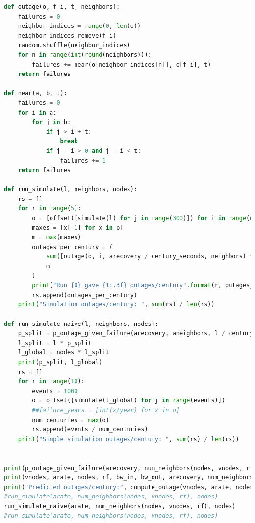 \documentclass{article}
\begin{document}
\begin{lstlisting}[language=Python]
def outage(o, f_i, t, neighbors):
    failures = 0
    neighbor_indices = range(0, len(o))
    neighbor_indices.remove(f_i)
    random.shuffle(neighbor_indices)
    for n in range(int(round(neighbors))):
        failures += near(o[neighbor_indices[n]], o[f_i], t)
    return failures

def near(a, b, t):
    failures = 0
    for i in a:
        for j in b:
            if j > i + t:
                break
            if j - i > 0 and j - i < t:
                failures += 1
    return failures

def run_simulate(l, neighbors, nodes):
    rs = []
    for r in range(5):
        o = [offset([simulate(l) for j in range(300)]) for i in range(nodes)]
        maxes = [x[-1] for x in o]
        m = max(maxes)
        outages_per_century = (
            sum([outage(o, i, arecovery / century_seconds, neighbors) for i in range(nodes)]) /
            m
        )
        print("Run {0} gave {1:.3f} outages/century".format(r, outages_per_century))
        rs.append(outages_per_century)
    print("Simulation outages/century: ", sum(rs) / len(rs))

def run_simulate_naive(l, neighbors, nodes):
    p_split = p_outage_given_failure(arecovery, aneighbors, l / century_seconds)
    l_split = l * p_split
    l_global = nodes * l_split
    print(p_split, l_global)
    rs = []
    for r in range(10):
        events = 1000
        o = offset([simulate(l_global) for j in range(events)])
        ##failure_years = [int(x/year) for x in o]
        num_centuries = max(o)
        rs.append(events / num_centuries)
    print("Simple simulation outages/century: ", sum(rs) / len(rs))


print(p_outage_given_failure(arecovery, num_neighbors(nodes, vnodes, rf), arate))
print(vnodes, arate, nodes, rf, bw_in, bw_out, arecovery, num_neighbors(nodes, vnodes, rf))
print("Predicted outages/century:", compute_outage(vnodes, arate, nodes, rf, bw_in, bw_out))
#run_simulate(arate, num_neighbors(nodes, vnodes, rf), nodes)
run_simulate_naive(arate, num_neighbors(nodes, vnodes, rf), nodes)
#run_simulate(arate, num_neighbors(nodes, vnodes, rf), nodes)
\end{lstlisting}
\end{document}
